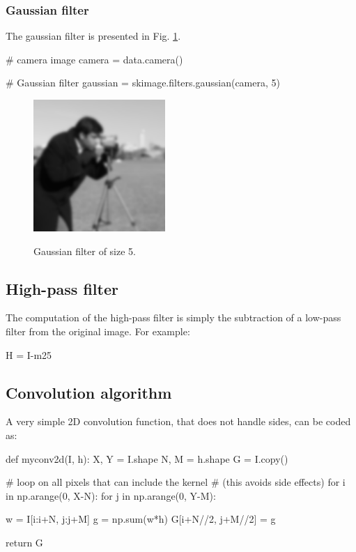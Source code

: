 \subsubsection{Gaussian filter}
The gaussian filter is presented in Fig. \ref{fig:introduction:python:gaussian}.
\begin{python}
# camera image
camera = data.camera()

# Gaussian filter
gaussian = skimage.filters.gaussian(camera, 5)
\end{python}

\vspace*{-4pt}

\begin{figure}[H]
 \centering\caption{Gaussian filter of size 5.}%
 \includegraphics[width=5cm]{gaussian.png}%
 \label{fig:introduction:python:gaussian}%
\end{figure}

\subsection{High-pass filter}
The computation of the high-pass filter is simply the subtraction of a low-pass filter from the original image. For example:

\begin{python}
H = I-m25
\end{python}

\subsection{Convolution algorithm}

A very simple 2D convolution function, that does not handle sides, can be coded as:

\begin{python}
 def myconv2d(I, h):
    X, Y = I.shape
    N, M = h.shape
    G = I.copy()
    
    # loop on all pixels that can include the kernel 
    # (this avoids side effects)
    for i in np.arange(0, X-N):
        for j in np.arange(0, Y-M):
            
            w = I[i:i+N, j:j+M]
            g = np.sum(w*h)
            G[i+N//2, j+M//2] = g
            
    return G
\end{python}
 
